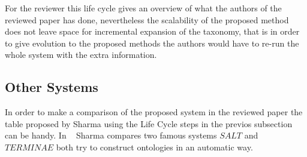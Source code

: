 \documentclass[4pt,a4paper,twocolumn]{article}
\begin{document}
For the reviewer this life cycle gives an overview of what the authors of the reviewed paper has done, nevertheless the scalability of the proposed method does not leave space for incremental expansion of the taxonomy, that is in order to give evolution to the proposed methods the authors would have to re-run the whole system with the extra information.



\subsection*{Other Systems}

In order to make a comparison of the proposed system in the reviewed paper the table proposed by Sharma using the Life Cycle steps in the previos subsection can be handy. In ~\cite{IJOATsemantic-domain-ontology} Sharma compares two famous systems  $SALT$ and $TERMINAE$ both try to construct ontologies in an automatic way.
\end{document}
